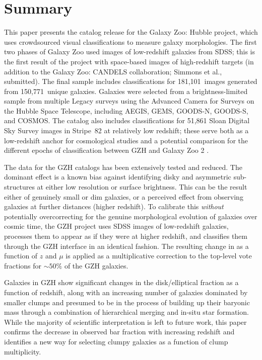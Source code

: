 \documentclass[twocolumn]{aastex6}
\begin{document}
\section{Summary}\label{sec:summary}


This paper presents the catalog release for the Galaxy Zoo: Hubble project,
which uses crowdsourced visual classifications to measure galaxy morphologies.
The first two phases of Galaxy Zoo \citep{lin11,wil13} used images of
low-redshift galaxies from SDSS; this is the first result of the project with
space-based images of high-redshift targets (in addition to the Galaxy Zoo:
CANDELS collaboration; Simmons et al., submitted). The final sample includes
classifications for 181,101~images generated from 150,771~unique galaxies.
Galaxies were selected from a brightness-limited sample from multiple Legacy
surveys using the Advanced Camera for Surveys on the Hubble Space Telescope,
including AEGIS, GEMS, GOODS-N, GOODS-S, and COSMOS. The catalog also includes
classifications for 51,861 Sloan Digital Sky Survey images in Stripe~82 at
relatively low redshift; these serve both as a low-redshift anchor for
cosmological studies and a potential comparison for the different epochs of
classification between GZH and Galaxy Zoo 2 \citep{wil13}. 

The data for the GZH catalogs has been extensively tested and reduced. The
dominant effect is a known bias against identifying disky and asymmetric
sub-structures at either low resolution or surface brightness. This can be the
result either of genuinely small or dim galaxies, or a perceived effect from
observing galaxies at further distances (higher redshift). To calibrate this
\emph{without} potentially overcorrecting for the genuine morphological
evolution of galaxies over cosmic time, the GZH project uses SDSS images of
low-redshift galaxies, processes them to appear as if they were at higher
redshift, and classifies them through the GZH interface in an identical
fashion. The resulting change in \ffeatures{} as a function of $z$ and $\mu$ is
applied as a multiplicative correction to the top-level vote fractions for
$\sim50\%$ of the GZH galaxies. 

Galaxies in GZH show significant changes in the disk/elliptical fraction as a
function of redshift, along with an increasing number of galaxies dominated by
smaller clumps and presumed to be in the process of building up their baryonic
mass through a combination of hierarchical merging and in-situ star formation.
While the majority of scientific interpretation is left to future work, this
paper confirms the decrease in observed bar fraction with increasing redshift
\citep{mel14} and identifies a new way for selecting clumpy galaxies as a
function of clump multiplicity.
\end{document}

